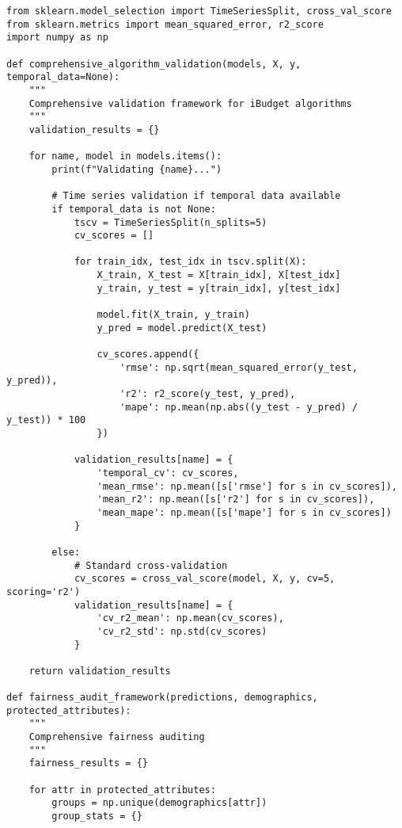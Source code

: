 \documentclass[12pt]{article}
\begin{document}
\begin{lstlisting}
from sklearn.model_selection import TimeSeriesSplit, cross_val_score
from sklearn.metrics import mean_squared_error, r2_score
import numpy as np

def comprehensive_algorithm_validation(models, X, y, temporal_data=None):
    """
    Comprehensive validation framework for iBudget algorithms
    """
    validation_results = {}
    
    for name, model in models.items():
        print(f"Validating {name}...")
        
        # Time series validation if temporal data available
        if temporal_data is not None:
            tscv = TimeSeriesSplit(n_splits=5)
            cv_scores = []
            
            for train_idx, test_idx in tscv.split(X):
                X_train, X_test = X[train_idx], X[test_idx]
                y_train, y_test = y[train_idx], y[test_idx]
                
                model.fit(X_train, y_train)
                y_pred = model.predict(X_test)
                
                cv_scores.append({
                    'rmse': np.sqrt(mean_squared_error(y_test, y_pred)),
                    'r2': r2_score(y_test, y_pred),
                    'mape': np.mean(np.abs((y_test - y_pred) / y_test)) * 100
                })
            
            validation_results[name] = {
                'temporal_cv': cv_scores,
                'mean_rmse': np.mean([s['rmse'] for s in cv_scores]),
                'mean_r2': np.mean([s['r2'] for s in cv_scores]),
                'mean_mape': np.mean([s['mape'] for s in cv_scores])
            }
        
        else:
            # Standard cross-validation
            cv_scores = cross_val_score(model, X, y, cv=5, scoring='r2')
            validation_results[name] = {
                'cv_r2_mean': np.mean(cv_scores),
                'cv_r2_std': np.std(cv_scores)
            }
    
    return validation_results

def fairness_audit_framework(predictions, demographics, protected_attributes):
    """
    Comprehensive fairness auditing
    """
    fairness_results = {}
    
    for attr in protected_attributes:
        groups = np.unique(demographics[attr])
        group_stats = {}
        

\end{lstlisting}
\end{document}
